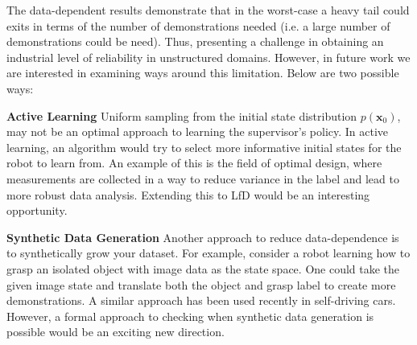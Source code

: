 \documentclass[10pt, conference]{ieeeconf}      %
\newcommand{\bx}{\mathbf{x}}
\begin{document}
The data-dependent results demonstrate that in the worst-case a heavy tail could exits in terms of the number of demonstrations needed (i.e. a large number of demonstrations could be need). Thus, presenting a challenge in obtaining an industrial level of reliability in unstructured domains. However, in future work we are interested in examining ways around this limitation. Below are two possible ways:

\noindent \textbf{Active Learning} Uniform sampling from the initial state distribution $p(\bx_0)$, may not be an optimal approach to learning the supervisor's policy. In active learning, an algorithm would try to select more informative initial states for the robot to learn from. An example of this is the field of optimal design, where measurements are collected in a way to reduce variance in the label and lead to more robust data analysis. Extending this to LfD would be an interesting opportunity. 

\noindent \textbf{Synthetic Data Generation} Another approach to reduce data-dependence is to synthetically grow your dataset. For example, consider a robot learning how to grasp an isolated object  with image data as the state space. One could take the given image state and translate both the object and grasp label to create more demonstrations. A similar approach has been used recently in self-driving cars. However, a formal approach to checking when synthetic data generation is possible would be an exciting new direction. 



\end{document}
